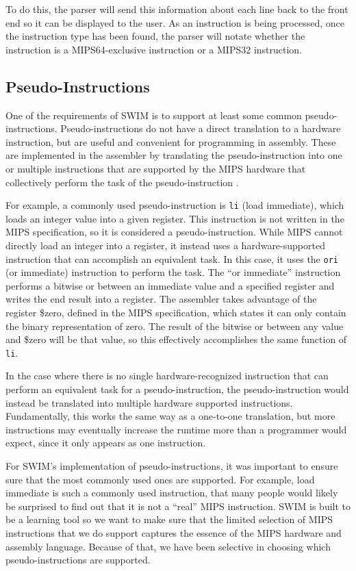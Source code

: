 \documentclass[
    paper=letter,
    parskip=half,
    fontsize=12pt,
    titlepage=firstiscover,
    toc=bibliography,
    numbers=endperiod
]{scrartcl}
\begin{document}
To do this, the parser will send this information about each line back
to the front end so it can be displayed to the user. As an instruction
is being processed, once the instruction type has been found, the parser
will notate whether the instruction is a MIPS64-exclusive instruction or
a MIPS32 instruction.

\subsection{Pseudo-Instructions}

One of the requirements of SWIM is to support at least some common
pseudo-instructions. Pseudo-instructions do not have a direct
translation to a hardware instruction, but are useful and convenient for
programming in assembly. These are implemented in the assembler by
translating the pseudo-instruction into one or multiple instructions
that are supported by the MIPS hardware that collectively perform the
task of the pseudo-instruction \cite{koehn-pseudoinstructions}.

For example, a commonly used pseudo-instruction is \texttt{li} (load
immediate), which loads an integer value into a given register. This
instruction is not written in the MIPS specification, so it is
considered a pseudo-instruction. While MIPS cannot directly load an
integer into a register, it instead uses a hardware-supported
instruction that can accomplish an equivalent task. In this case, it
uses the \texttt{ori} (or immediate) instruction to perform the task.
The ``or immediate'' instruction performs a bitwise or between an
immediate value and a specified register and writes the end result into
a register. The assembler takes advantage of the register \$zero,
defined in the MIPS specification, which states it can only contain the
binary representation of zero. The result of the bitwise or between any
value and \$zero will be that value, so this effectively accomplishes
the same function of \texttt{li}.

In the case where there is no single hardware-recognized instruction
that can perform an equivalent task for a pseudo-instruction, the
pseudo-instruction would instead be translated into multiple hardware
supported instructions. Fundamentally, this works the same way as a
one-to-one translation, but more instructions may eventually increase
the runtime more than a programmer would expect, since it only appears
as one instruction.

For SWIM's implementation of pseudo-instructions, it was important to
ensure sure that the most commonly used ones are supported. For example,
load immediate is such a commonly used instruction, that many people
would likely be surprised to find out that it is not a ``real'' MIPS
instruction. SWIM is built to be a learning tool so we want to make sure
that the limited selection of MIPS instructions that we do support
captures the essence of the MIPS hardware and assembly language. Because
of that, we have been selective in choosing which pseudo-instructions
are supported.
\end{document}
